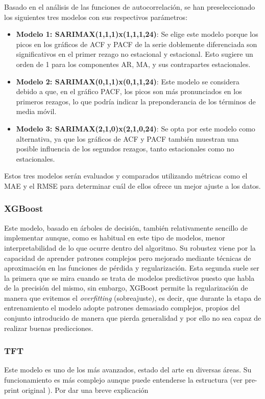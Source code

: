 Basado en el análisis de las funciones de autocorrelación, se han preseleccionado los siguientes tres modelos con sus respectivos parámetros:

\begin{itemize}
    \item \textbf{Modelo 1: SARIMAX(1,1,1)x(1,1,1,24)}:
    Se elige este modelo porque los picos en los gráficos de ACF y PACF de la serie doblemente diferenciada son significativos en el primer rezago no estacional y estacional. Esto sugiere un orden de 1 para los componentes AR, MA, y sus contrapartes estacionales.

    \item \textbf{Modelo 2: SARIMAX(0,1,1)x(0,1,1,24)}:
    Este modelo se considera debido a que, en el gráfico PACF, los picos son más pronunciados en los primeros rezagos, lo que podría indicar la preponderancia de los términos de media móvil.

    \item \textbf{Modelo 3: SARIMAX(2,1,0)x(2,1,0,24)}:
    Se opta por este modelo como alternativa, ya que los gráficos de ACF y PACF también muestran una posible influencia de los segundos rezagos, tanto estacionales como no estacionales.
\end{itemize}

Estos tres modelos serán evaluados y comparados utilizando métricas como el MAE y el RMSE para determinar cuál de ellos ofrece un mejor ajuste a los datos.
%
%
%
\subsubsection{XGBoost}
%
%
%
Este modelo, basado en árboles de decisión, también relativamente sencillo de implementar aunque, como es habitual en este tipo de modelos, menor interpretabilidad de lo que ocurre dentro del algoritmo. Su robustez viene por la capacidad de aprender patrones complejos pero mejorado mediante técnicas de aproximación en las funciones de pérdida y regularización. Esta segunda suele ser la primera que se mira cuando se trata de modelos predictivos puesto que habla de la precisión del mismo, sin embargo, XGBoost permite la regularización de manera que evitemos el \textit{overfitting} (sobreajuste), es decir, que durante la etapa de entrenamiento el modelo adopte patrones demasiado complejos, propios del conjunto introducido de manera que pierda generalidad y por ello no sea capaz de realizar buenas predicciones.
%
%
%
\subsubsection{TFT}
%
%
%
Este modelo es uno de los más avanzados, estado del arte en diversas áreas. Su funcionamiento es más complejo aunque puede entenderse la estructura (ver pre-print original \cite{TFT}). Por dar una breve explicación
%
%
%

